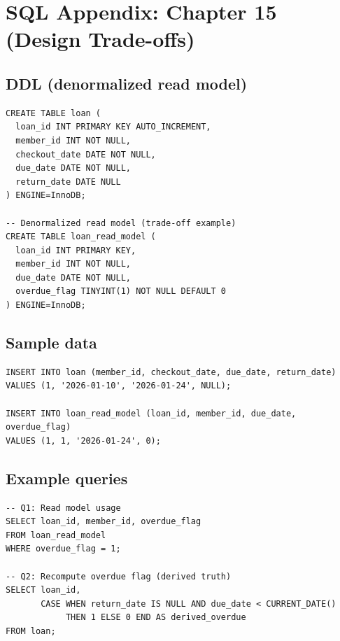 \chapter{SQL Appendix: Chapter 15 (Design Trade-offs)}

\section{DDL (denormalized read model)}
\begin{verbatim}
CREATE TABLE loan (
  loan_id INT PRIMARY KEY AUTO_INCREMENT,
  member_id INT NOT NULL,
  checkout_date DATE NOT NULL,
  due_date DATE NOT NULL,
  return_date DATE NULL
) ENGINE=InnoDB;

-- Denormalized read model (trade-off example)
CREATE TABLE loan_read_model (
  loan_id INT PRIMARY KEY,
  member_id INT NOT NULL,
  due_date DATE NOT NULL,
  overdue_flag TINYINT(1) NOT NULL DEFAULT 0
) ENGINE=InnoDB;
\end{verbatim}

\section{Sample data}
\begin{verbatim}
INSERT INTO loan (member_id, checkout_date, due_date, return_date)
VALUES (1, '2026-01-10', '2026-01-24', NULL);

INSERT INTO loan_read_model (loan_id, member_id, due_date, overdue_flag)
VALUES (1, 1, '2026-01-24', 0);
\end{verbatim}

\section{Example queries}
\begin{verbatim}
-- Q1: Read model usage
SELECT loan_id, member_id, overdue_flag
FROM loan_read_model
WHERE overdue_flag = 1;

-- Q2: Recompute overdue flag (derived truth)
SELECT loan_id,
       CASE WHEN return_date IS NULL AND due_date < CURRENT_DATE()
            THEN 1 ELSE 0 END AS derived_overdue
FROM loan;
\end{verbatim}
